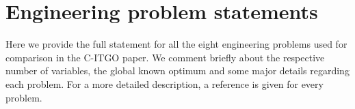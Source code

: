 
\section*{Engineering problem statements}

Here we provide the full statement for all the eight engineering problems used for comparison in the C-ITGO paper. We comment briefly about the respective number of variables, the global known optimum and some major details regarding each problem. For a more detailed description, a reference is given for every problem.

\vspace{0.5cm}








